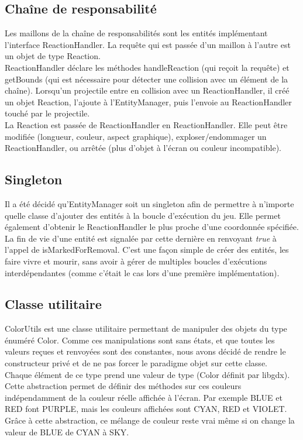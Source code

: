 \documentclass[11pt,a4paper,twoside,svgnames]{article}
\begin{document}
\subsection{Chaîne de responsabilité}
Les maillons de la chaîne de responsabilités sont les entités implémentant l'interface ReactionHandler. La requête qui est passée d'un maillon à l'autre est un objet de type Reaction.\\

ReactionHandler déclare les méthodes handleReaction (qui reçoit la requête) et getBounds (qui est nécessaire pour détecter une collision avec un élément de la chaîne). Lorsqu'un projectile entre en collision avec un ReactionHandler, il créé un objet Reaction, l'ajoute à l'EntityManager, puis l'envoie au ReactionHandler touché par le projectile.\\

La Reaction est passée de ReactionHandler en ReactionHandler. Elle peut être modifiée (longueur, couleur, aspect graphique), exploser/endommager un ReactionHandler, ou arrêtée (plus d'objet à l'écran ou couleur incompatible).

\subsection{Singleton}
Il a été décidé qu'EntityManager soit un singleton afin de permettre à n'importe quelle classe d'ajouter des entités à la boucle d'exécution du jeu. Elle permet également d'obtenir le ReactionHandler le plus proche d'une coordonnée spécifiée. La fin de vie d'une entité est signalée par cette dernière en renvoyant \textit{true} à l'appel de isMarkedForRemoval. C'est une façon simple de créer des entités, les faire vivre et mourir, sans avoir à gérer de multiples boucles d'exécutions interdépendantes (comme c'était le cas lors d'une première implémentation).

\subsection{Classe utilitaire}
ColorUtils est une classe utilitaire permettant de manipuler des objets du type énuméré Color. Comme ces manipulations sont sans états, et que toutes les valeurs reçues et renvoyées sont des constantes, nous avons décidé de rendre le constructeur privé et de ne pas forcer le paradigme objet sur cette classe.\\

Chaque élément de ce type prend une valeur de type  (Color définit par libgdx). Cette abstraction permet de définir des méthodes sur ces couleurs indépendamment de la couleur réelle affichée à l'écran. Par exemple BLUE et RED font PURPLE, mais les couleurs affichées sont CYAN, RED et VIOLET. Grâce à cette abstraction, ce mélange de couleur reste vrai même si on change la valeur de BLUE de CYAN à SKY.\\
\end{document}
